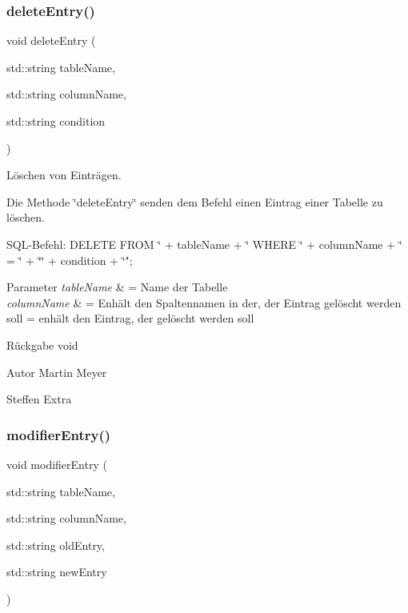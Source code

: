 \subsubsection{delete\+Entry()}
{\footnotesize\ttfamily void delete\+Entry (\begin{DoxyParamCaption}\item[{std\+::string}]{table\+Name,  }\item[{std\+::string}]{column\+Name,  }\item[{std\+::string}]{condition }\end{DoxyParamCaption})}



Löschen von Einträgen. 

Die Methode \char`\"{}delete\+Entry\char`\"{} senden dem Befehl einen Eintrag einer Tabelle zu löschen.~\newline


S\+Q\+L-\/\+Befehl\+: D\+E\+L\+E\+TE F\+R\+OM \char`\"{} + table\+Name + \char`\"{} W\+H\+E\+RE \char`\"{} + column\+Name + \char`\"{} = \char`\"{} + \char`\"{}\textquotesingle{}\char`\"{} + condition + \char`\"{}\textquotesingle{}";


\begin{DoxyParams}{Parameter}
{\em table\+Name} & = Name der Tabelle \\
\hline
{\em column\+Name} & = Enhält den Spaltennamen in der, der Eintrag gelöscht werden soll  = enhält den Eintrag, der gelöscht werden soll\\
\hline
\end{DoxyParams}
\begin{DoxyReturn}{Rückgabe}
void
\end{DoxyReturn}
\begin{DoxyAuthor}{Autor}
Martin Meyer 

Steffen Extra 
\end{DoxyAuthor}
\mbox{\label{entry_8hpp_ab254b5514a4950c7479bc4d513c438dc}} 
\subsubsection{modifier\+Entry()}
{\footnotesize\ttfamily void modifier\+Entry (\begin{DoxyParamCaption}\item[{std\+::string}]{table\+Name,  }\item[{std\+::string}]{column\+Name,  }\item[{std\+::string}]{old\+Entry,  }\item[{std\+::string}]{new\+Entry }\end{DoxyParamCaption})}



